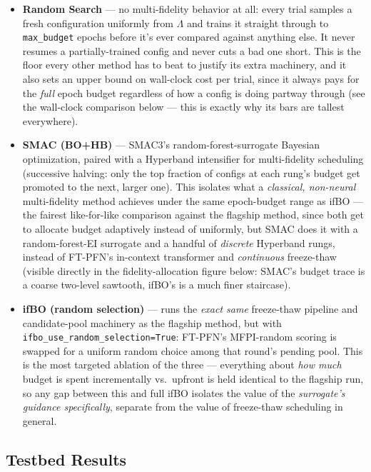 \documentclass[10pt]{article}
\begin{document}
\begin{itemize}
    \item \textbf{Random Search} --- no multi-fidelity behavior at all: every trial
    samples a fresh configuration uniformly from $\Lambda$ and trains it straight through to
    \texttt{max\_budget} epochs before it's ever compared against anything else. It never resumes a
    partially-trained config and never cuts a bad one short. This is the floor every other method
    has to beat to justify its extra machinery, and it also sets an upper bound on wall-clock cost
    per trial, since it always pays for the \emph{full} epoch budget regardless of how a config is
    doing partway through (see the wall-clock comparison below --- this is exactly why its bars are
    tallest everywhere).
    \item \textbf{SMAC (BO+HB)} --- SMAC3's random-forest-surrogate Bayesian
    optimization, paired with a Hyperband intensifier for multi-fidelity scheduling (successive
    halving: only the top fraction of configs at each rung's budget get promoted to the next,
    larger one). This isolates what a \emph{classical, non-neural} multi-fidelity method achieves under
    the same epoch-budget range as ifBO --- the fairest like-for-like comparison against the
    flagship method, since both get to allocate budget adaptively instead of uniformly, but SMAC
    does it with a random-forest-EI surrogate and a handful of \emph{discrete} Hyperband rungs, instead
    of FT-PFN's in-context transformer and \emph{continuous} freeze-thaw (visible directly in the
    fidelity-allocation figure below: SMAC's budget trace is a coarse two-level sawtooth, ifBO's
    is a much finer staircase).
    \item \textbf{ifBO (random selection)} --- runs the \emph{exact same} freeze-thaw pipeline and candidate-pool
    machinery as the flagship method, but with \texttt{ifbo\_use\_random\_selection=True}: FT-PFN's MFPI-random scoring is swapped for a uniform random choice among that round's pending pool. This is the
    most targeted ablation of the three --- everything about \emph{how much} budget is spent
    incrementally vs.\ upfront is held identical to the flagship run, so any gap between this and
    full ifBO isolates the value of the \emph{surrogate's guidance specifically}, separate from the
    value of freeze-thaw scheduling in general.
\end{itemize}

\subsection*{Testbed Results}
\end{document}
